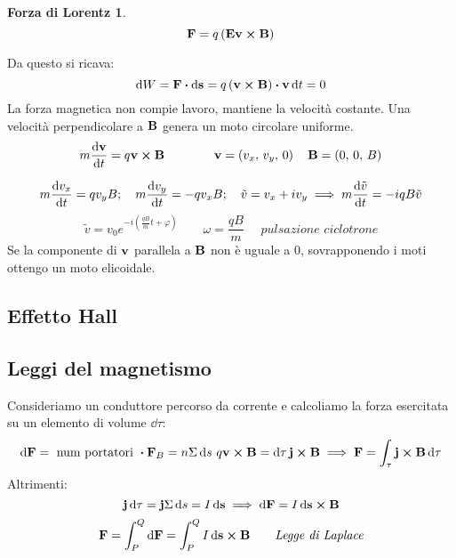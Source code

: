 \documentclass[12pt,a4paper]{article}
\begin{document}
\newtheorem*{FL}{Forza di Lorentz}
\begin{FL}
    \begin{equation*}
        \vb{F}= q \left( \vb{E} \vb{v}\cp \vb{B} \right)
    \end{equation*}
\end{FL}

Da questo si ricava:
\begin{equation*}
    \dd{W}= \vb{F}\vdot\dd{\vb{s}}= q\left( \vb{v}\cp \vb{B}\right) \vdot\vb{v} \dd{t} = 0
\end{equation*}
La forza magnetica non compie lavoro, mantiene la velocità costante.
Una velocità perpendicolare a $\vb{B}$ genera un moto circolare uniforme.
\begin{equation*}
    m\dv{\vb{v}}{t}= q\vb{v}\cp \vb{B}\qquad\qquad \vb{v}= \left( v_x,\,v_y,\,0 \right)\quad \vb{B}= \left( 0,\,0,\,B \right)
\end{equation*}

\begin{equation*}
    m\dv{v_x}{t}=qv_yB; \quad m\dv{v_y}{t}= -qv_xB; \quad\tilde{v}= v_x + iv_y \implies m\dv{\tilde{v}}{t}= -iqB\tilde{v}
\end{equation*}
\begin{equation*}
    \tilde{v}= v_0e^{-i\left( \frac{qB}{m}t+\varphi \right)} \qquad \omega= \frac{qB}{m}\quad \textit{ pulsazione ciclotrone}
\end{equation*}
Se la componente di $\vb{v}$ parallela a $\vb{B}$ non è uguale a 0, sovrapponendo i moti ottengo un moto elicoidale.

\subsection{Effetto Hall}


\subsection{Leggi del magnetismo}
Consideriamo un conduttore percorso da corrente e calcoliamo la forza esercitata su un elemento di volume $\dd{\tau}$:
\begin{equation*}
    \dd{\vb{F}}=\text{ num portatori }\vdot \vb{F}_B= n \Sigma\dd{s}\,q\vb{v}\cp\vb{B}= \dd{\tau} \vb{j}\cp\vb{B} 
    \implies \vb{F}= \int _\tau\vb{j}\cp \vb{B}\dd{\tau} 
\end{equation*}
Altrimenti:
\begin{equation*}
    \vb{j}\dd{\tau}= \vb{j}\Sigma\dd{s}= I \dd{\vb{s}} \implies \dd{\vb{F}}= I \dd{\vb{s}}\cp\vb{B} 
\end{equation*}
\begin{equation*}
    \vb{F}= \int_{P}^{Q}\dd{\vb{F}}= \int_{P}^{Q}I\dd{\vb{s}}\cp\vb{B} \qquad \textit{Legge di Laplace}
\end{equation*}
\end{document}
